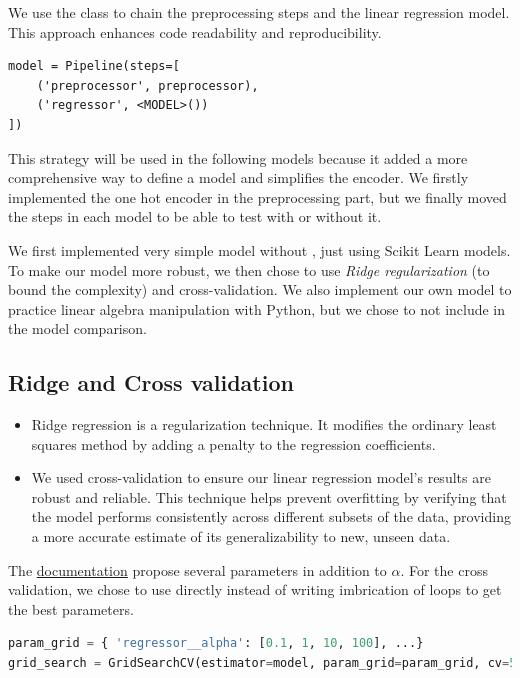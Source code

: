 We use the  class to chain the preprocessing steps and the linear regression model. This approach enhances code readability and reproducibility.
\begin{lstlisting}
model = Pipeline(steps=[
    ('preprocessor', preprocessor),
    ('regressor', <MODEL>())
])
\end{lstlisting}

This strategy will be used in the following models because it added a more comprehensive way to define a model and simplifies the encoder. We firstly implemented the one hot encoder in the preprocessing part, but we finally moved the steps in each model to be able to test with or without it.

We first implemented very simple model without , just using Scikit Learn  models. To make our model more robust, we then chose to use \textit{Ridge regularization} (to bound the complexity) and cross-validation. We also implement our own model to practice linear algebra manipulation with Python, but we chose to not include in the model comparison.

\subsection{Ridge and Cross validation}
\begin{itemize}
    \item Ridge regression is a regularization technique. It modifies the ordinary least squares method by adding a penalty to the regression coefficients.
    \item We used cross-validation to ensure our linear regression model's results are robust and reliable. This technique helps prevent overfitting by verifying that the model performs consistently across different subsets of the data, providing a more accurate estimate of its generalizability to new, unseen data.
\end{itemize}
The \href{https://scikit-learn.org/stable/modules/generated/sklearn.linear_model.Ridge.html}{documentation} propose several parameters in addition to $\alpha$. For the cross validation, we chose to use directly  instead of writing imbrication of  loops to get the best parameters.
\begin{lstlisting}[language=Python]
param_grid = { 'regressor__alpha': [0.1, 1, 10, 100], ...}
grid_search = GridSearchCV(estimator=model, param_grid=param_grid, cv=5)
\end{lstlisting}

